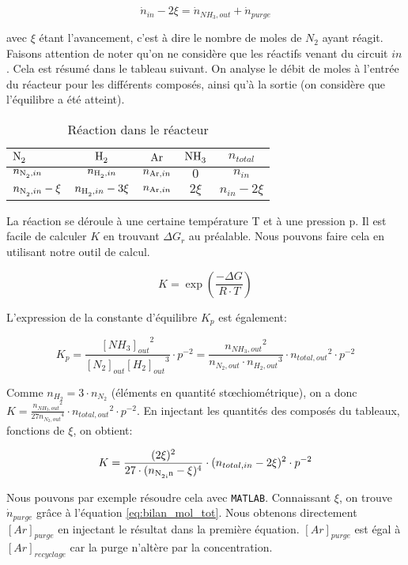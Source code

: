 \documentclass[a4paper, oneside, 12pt]{article}
\begin{document}
\begin{equation}
	\dot{n}_{in} - 2\xi=\dot{n}_{NH_3,out} + \dot{n}_{purge}
	\label{eq:bilan_mol_tot}
\end{equation}

avec $\xi$ étant l'avancement, c'est à dire le nombre de moles de $N_2$ ayant réagit. 
Faisons attention de noter qu'on ne considère que les réactifs venant du circuit $in$. 
Cela est résumé dans le tableau suivant. 
On analyse le débit de moles à l'entrée du réacteur pour les différents composés, 
ainsi qu'à la sortie (on considère que l'équilibre a été atteint).

\begin{table}[!h]
	\centering
	\begin{tabular}{l|c|c|c|c}
		$\ce{N2}$ & $\ce{H2}$ & $\ce{Ar}$ & $\ce{NH3}$ & $n_{total}$ \\
		\hline
		$n_{\ce{N2},in}$ & $n_{\ce{H2},in}$ & $n_{\ce{Ar},in}$ & $0$  & $n_{in}$\\
		$n_{\ce{N2},in}-\xi$ & $n_{\ce{H2},in}-3\xi$ & $n_{\ce{Ar},in}$ & $2\xi$  & $n_{in}-2\xi$\\
	\end{tabular}
	\caption{Réaction dans le réacteur}
	\label{tab:reaction1_primaire}
\end{table}

La réaction se déroule à une certaine température T et à une pression p. 
Il est facile de calculer $K$ en trouvant $\Delta G_{r}$ au préalable. 
Nous pouvons faire cela en utilisant notre outil de calcul.

\[
K=\exp(\frac{-\Delta G}{R \cdot T})\]

L'expression de la constante d'équilibre $K_p$ est également: 

\[
K_p=\frac{{[NH_3]_{out}}^2}{[N_2]_{out}{[H_2]_{out}}^3} \cdot p^{-2} = 
\frac{{n_{NH_3,out}}^2}{n_{N_2,out}\cdot {n_{H_2,out}}^3}\cdot {n_{total,out}}^2\cdot p^{-2}
\]

Comme $n_{H_2}=3\cdot n_{N_2}$ (éléments en quantité stœchiométrique), on a donc 
$K=\frac{{n_{NH_3,out}}^2}{27{n_{N_2,out}}^4}\cdot {n_{total,out}}^2\cdot p^{-2}$. En injectant les 
quantités des composés du tableaux, fonctions de $\xi$, on obtient:

\[ K=\frac{({2\xi})^2}{27 \cdot ({{n_{\ce{N2,in}}-\xi})^4}}\cdot ({n_{total,in}-2\xi})^2 \cdot p^{-2} \]

Nous pouvons par exemple résoudre cela avec \texttt{MATLAB}. 
Connaissant $\xi$, on trouve $\dot{n}_{purge}$ grâce à l'équation \ref{eq:bilan_mol_tot}. 
Nous obtenons directement $[Ar]_{purge}$ en injectant 
le résultat dans la première équation. $[Ar]_{purge}$ est égal à $[Ar]_{recyclage}$ 
car la purge n'altère par la concentration.
\end{document}
